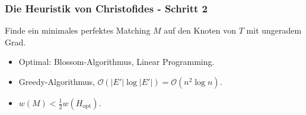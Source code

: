\begin{frame}
    \frametitle{Die Heuristik von Christofides - Schritt 2}
    Finde ein minimales perfektes Matching $M$ auf den Knoten von $T$ mit ungeradem Grad.
    \begin{itemize}
        \item Optimal: Blossom-Algorithmus, Linear Programming.
        \item Greedy-Algorithmus, $\mathcal{O}(|E'|\log |E'|) = \mathcal{O}(n^2\log n)$.
        \item $w(M) < \frac{1}{2}w(H_{\mathrm{opt}})$. %
    \end{itemize}
\end{frame}